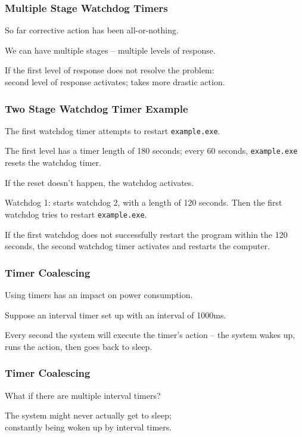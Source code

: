 \begin{frame}
\frametitle{Multiple Stage Watchdog Timers}
\begin{changemargin}{1cm}
So far corrective action has been all-or-nothing. 

We can have multiple stages -- multiple levels of response. 

If the first level of response does not resolve the problem: \\
\quad second level of response activates; takes more drastic action. 


\end{changemargin}
\end{frame}

\begin{frame}
\frametitle{Two Stage Watchdog Timer Example}
\begin{changemargin}{1cm}

The first watchdog timer attempts to restart \texttt{example.exe}. 

The first level has a timer length of 180 seconds; every 60 seconds, \texttt{example.exe} resets the watchdog timer. 

If the reset doesn't happen, the watchdog activates. 

Watchdog 1: starts watchdog 2, with a length of 120 seconds. Then the first watchdog tries to restart \texttt{example.exe}. 

If the first watchdog does not successfully restart the program within the 120 seconds, the second watchdog timer activates and restarts the computer.


\end{changemargin}
\end{frame}

\begin{frame}
\frametitle{Timer Coalescing}
\begin{changemargin}{1cm}

Using timers has an impact on power consumption. 

Suppose an interval timer set up with an interval of 1000ms. 

Every second the system will execute the timer's action -- the system wakes up, runs the action, then goes back to sleep. 

\end{changemargin}
\end{frame}

\begin{frame}
\frametitle{Timer Coalescing}
\begin{changemargin}{1cm}

What if there are multiple interval timers?

The system might never actually get to sleep; \\
\quad constantly being woken up by interval timers.

\end{changemargin}
\end{frame}

